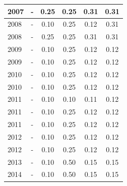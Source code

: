 \begin{table}[H]
\begin{tabular}{| l | c | c | c | c | c |}
            2007
          &
          -
          &
          0.25
          &
          0.25
          &
          0.31
          &
            {\color{red} 0.31}
          \\
\hline
            2008
          &
          -
          &
          0.10
          &
          0.25
          &
          0.12
          &
            {\color{red} 0.31}
          \\
            2008
          &
          -
          &
          0.25
          &
          0.25
          &
          0.31
          &
            {\color{red} 0.31}
          \\
\hline
            2009
          &
          -
          &
          0.10
          &
          0.25
          &
          0.12
          &
            {\color{red} 0.12}
          \\
            2009
          &
          -
          &
          0.10
          &
          0.25
          &
          0.12
          &
            {\color{red} 0.12}
          \\
\hline
            2010
          &
          -
          &
          0.10
          &
          0.25
          &
          0.12
          &
            {\color{red} 0.12}
          \\
            2010
          &
          -
          &
          0.10
          &
          0.25
          &
          0.12
          &
            {\color{red} 0.12}
          \\
\hline
            2011
          &
          -
          &
          0.10
          &
          0.10
          &
          0.11
          &
            {\color{red} 0.12}
          \\
            2011
          &
          -
          &
          0.10
          &
          0.25
          &
          0.12
          &
            {\color{red} 0.12}
          \\
            2011
          &
          -
          &
          0.10
          &
          0.25
          &
          0.12
          &
            {\color{red} 0.12}
          \\
\hline
            2012
          &
          -
          &
          0.10
          &
          0.25
          &
          0.12
          &
            {\color{red} 0.12}
          \\
            2012
          &
          -
          &
          0.10
          &
          0.25
          &
          0.12
          &
            {\color{red} 0.12}
          \\
\hline
            2013
          &
          -
          &
          0.10
          &
          0.50
          &
          0.15
          &
            {\color{red} 0.15}
          \\
\hline
            2014
          &
          -
          &
          0.10
          &
          0.50
          &
          0.15
          &
            {\color{red} 0.15}
          \\
\hline
\end{tabular}
\end{table}



